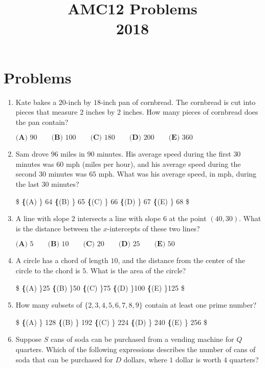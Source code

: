 \documentclass{article}
\title{AMC12 Problems \\ 2018}
\date{}
\begin{document}
\maketitle\thispagestyle{fancy}\newpage\section*{Problems}\begin{enumerate}[label=\arabic*., itemsep=0.5em]\item Kate bakes a $20$-inch by $18$-inch pan of cornbread. The cornbread is cut into pieces that measure $2$ inches by $2$ inches. How many pieces of cornbread does the pan contain?

$\textbf{(A) } 90 \qquad \textbf{(B) } 100 \qquad \textbf{(C) } 180 \qquad \textbf{(D) } 200 \qquad \textbf{(E) } 360$\par \vspace{0.5em}\item Sam drove $96$ miles in $90$ minutes. His average speed during the first $30$ minutes was $60$ mph (miles per hour), and his average speed during the second $30$ minutes was $65$ mph. What was his average speed, in mph, during the last $30$ minutes?

\$
\textbf\{(A) \} 64 \qquad
\textbf\{(B) \} 65 \qquad
\textbf\{(C) \} 66 \qquad
\textbf\{(D) \} 67 \qquad
\textbf\{(E) \} 68
\$\par \vspace{0.5em}\item A line with slope $2$ intersects a line with slope $6$ at the point $(40,30)$. What is the distance between the $x$-intercepts of these two lines? 

$\textbf{(A) } 5 \qquad \textbf{(B) } 10 \qquad \textbf{(C) } 20 \qquad \textbf{(D) } 25 \qquad \textbf{(E) } 50$\par \vspace{0.5em}\item A circle has a chord of length $10$, and the distance from the center of the circle to the chord is $5$. What is the area of the circle?

\$
\textbf\{(A) \}25\pi \qquad
\textbf\{(B) \}50\pi \qquad
\textbf\{(C) \}75\pi \qquad
\textbf\{(D) \}100\pi \qquad
\textbf\{(E) \}125\pi \qquad
\$\par \vspace{0.5em}\item How many subsets of $\{2,3,4,5,6,7,8,9\}$ contain at least one prime number?

\$
\textbf\{(A) \} 128 \qquad
\textbf\{(B) \} 192 \qquad
\textbf\{(C) \} 224 \qquad
\textbf\{(D) \} 240 \qquad
\textbf\{(E) \} 256
\$\par \vspace{0.5em}\item Suppose $S$ cans of soda can be purchased from a vending machine for $Q$ quarters. Which of the following expressions describes the number of cans of soda that can be purchased for $D$ dollars, where $1$ dollar is worth $4$ quarters?


\end{enumerate}
\end{document}
